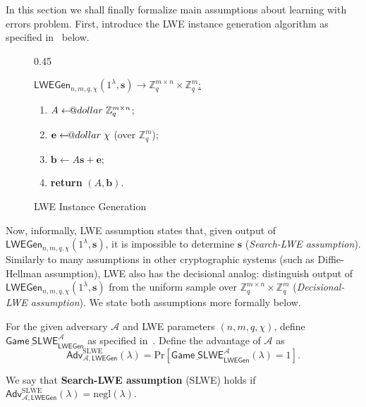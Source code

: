 \documentclass{template}
\makeatletter
\newcommand\leftarrowS{\leftarrow\joinrel\smalldollar}
\newcommand{\smalldollar}{\mathrel{\mathpalette\small@dollar\relax}}
\newcommand{\small@dollar}[2]{%
  \vcenter{\hbox{%
    $#1\textnormal{\fontsize{0.7\dimexpr\f@size pt}{0}\selectfont\$}$%
  }}%
}
\makeatother
\begin{document}
In this section we shall finally formalize main assumptions about learning with
errors problem. First, introduce the LWE instance generation algorithm as
specified in~ below.

\begin{figure}[ht]
\centering
\begin{varwidth}{0.45\linewidth}
\begin{mdframed}[linecolor=black,
                 linewidth=1.0pt,
                 skipabove=10pt,
                 skipbelow=10pt,
                 leftmargin=0pt,
                 rightmargin=0pt]
\colorbox{purple!10}{\underline{$\mathsf{LWEGen}_{n,m,q,\chi}(1^{\lambda}, \mathbf{s}) \to \mathbb{Z}_q^{m \times n} \times \mathbb{Z}_q^m$:}}
\begin{enumerate}
    \item $A \leftarrowS \mathbb{Z}_q^{m \times n}$;
    \item $\mathbf{e} \leftarrowS \chi$ (over $\mathbb{Z}_q^m$);
    \item $\mathbf{b} \gets A\mathbf{s} + \mathbf{e}$;
    \item \textbf{return} $(A, \mathbf{b})$.
\end{enumerate}
\end{mdframed}
\end{varwidth}
\caption{LWE Instance Generation}
\label{fig:lwe-instance}
\end{figure}

Now, informally, LWE assumption states that, given output of
$\mathsf{LWEGen}_{n,m,q,\chi}(1^{\lambda},\mathbf{s})$, it is impossible to
determine $\mathbf{s}$ (\textit{Search-LWE assumption}). Similarly to many
assumptions in other cryptographic systems (such as Diffie-Hellman assumption),
LWE also has the decisional analog: distinguish output of
$\mathsf{LWEGen}_{n,m,q,\chi}(1^{\lambda},\mathbf{s})$ from the uniform sample
over $\mathbb{Z}_q^{m \times n} \times \mathbb{Z}_q^m$ (\textit{Decisional-LWE
assumption}).  We state both assumptions more formally below.

\begin{definition}\label{def:search-lwe-assumption}
    For the given adversary $\mathcal{A}$ and LWE parameters $(n,m,q,\chi)$,
    define $\underline{\mathsf{Game} \;
    \mathsf{SLWE}}_{\mathsf{LWEGen}}^{\mathcal{A}}$ as specified
    in~. Define the advantage of $\mathcal{A}$ as
    \begin{equation*}
        \mathsf{Adv}^{\text{SLWE}}_{\mathcal{A},\mathsf{LWEGen}}(\lambda) = \text{Pr}\left[\underline{\mathsf{Game} \;
    \mathsf{SLWE}}_{\mathsf{LWEGen}}^{\mathcal{A}}(\lambda) = 1\right].
    \end{equation*}

    We say that \textbf{Search-LWE assumption} (SLWE) holds if
    $\mathsf{Adv}^{\text{SLWE}}_{\mathcal{A},\mathsf{LWEGen}}(\lambda)=\text{negl}(\lambda)$.
\end{definition}
\end{document}
